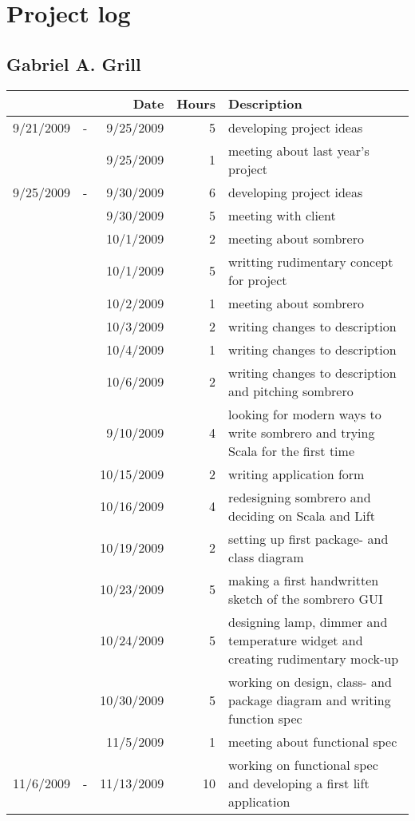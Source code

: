 \section{Project log}
\subsection{Gabriel A. Grill}
\begin{tabular}{| r c r | r | p{9cm} |}
\hline
& & Date & Hours & Description \\
\hline
9/21/2009	&	-	&	9/25/2009	&	5	&	developing project ideas \\
	&		&	9/25/2009	&	1	&	meeting about last year's project \\
9/25/2009	&	-	&	9/30/2009	&	6	&	developing project ideas \\
	&		&	9/30/2009	&	5	&	meeting with client \\
	&		&	10/1/2009	&	2	&	meeting about sombrero \\
	&		&	10/1/2009	&	5	&	writting rudimentary concept for project \\
	&		&	10/2/2009	&	1	&	meeting about sombrero \\
	&		&	10/3/2009	&	2	&	writing changes to description \\
	&		&	10/4/2009	&	1	&	writing changes to description \\
	&		&	10/6/2009	&	2	&	writing changes to description and pitching sombrero \\
	&		&	9/10/2009	&	4	&	looking for modern ways to write sombrero and trying Scala for the first time \\
	&		&	10/15/2009	&	2	&	writing application form \\
	&		&	10/16/2009	&	4	&	redesigning sombrero and deciding on Scala and Lift \\
	&		&	10/19/2009	&	2	&	setting up first package- and class diagram \\
	&		&	10/23/2009	&	5	&	making a first handwritten sketch of the sombrero GUI \\
	&		&	10/24/2009	&	5	&	designing lamp, dimmer and temperature widget and creating rudimentary mock-up \\
	&		&	10/30/2009	&	5	&	working on design, class- and package diagram and writing function spec \\
	&		&	11/5/2009	&	1	&	meeting about functional spec \\
11/6/2009	&	-	&	11/13/2009	&	10	&	working on functional spec and developing a first lift application \\

\end{tabular}
